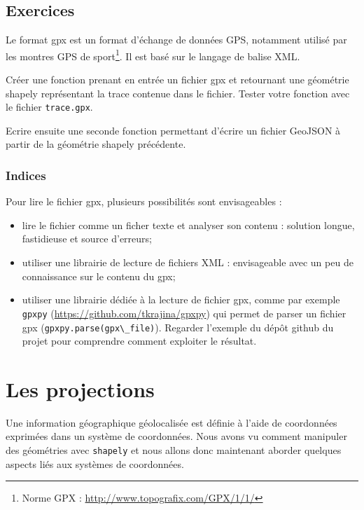 \documentclass[11pt]{article}
\newcommand{\passthrough}[1]{#1}
\def\tightlist{}
\begin{document}
\hypertarget{exercices-1}{%
\subsection{Exercices}\label{exercices-1}}

Le format gpx est un format d'échange de données GPS, notamment utilisé
par les montres GPS de sport\footnote{Norme GPX :
  \url{http://www.topografix.com/GPX/1/1/}}. Il est basé sur le langage
de balise XML.

Créer une fonction prenant en entrée un fichier gpx et retournant une
géométrie shapely représentant la trace contenue dans le fichier. Tester
votre fonction avec le fichier \passthrough{\lstinline!trace.gpx!}.

Ecrire ensuite une seconde fonction permettant d'écrire un fichier
GeoJSON à partir de la géométrie shapely précédente.

\hypertarget{indices-1}{%
\subsubsection{Indices}\label{indices-1}}

Pour lire le fichier gpx, plusieurs possibilités sont envisageables :

\begin{itemize}
\tightlist
\item
  lire le fichier comme un ficher texte et analyser son contenu :
  solution longue, fastidieuse et source d'erreurs;
\item
  utiliser une librairie de lecture de fichiers XML : envisageable avec
  un peu de connaissance sur le contenu du gpx;
\item
  utiliser une librairie dédiée à la lecture de fichier gpx, comme par
  exemple \passthrough{\lstinline!gpxpy!}
  (\url{https://github.com/tkrajina/gpxpy}) qui permet de parser un
  fichier gpx (\passthrough{\lstinline!gpxpy.parse(gpx\_file)!}).
  Regarder l'exemple du dépôt github du projet pour comprendre comment
  exploiter le résultat.
\end{itemize}

\hypertarget{les-projections}{%
\section{Les projections}\label{les-projections}}

Une information géographique géolocalisée est définie à l'aide de
coordonnées exprimées dans un système de coordonnées. Nous avons vu
comment manipuler des géométries avec \passthrough{\lstinline!shapely!}
et nous allons donc maintenant aborder quelques aspects liés aux
systèmes de coordonnées.
\end{document}
